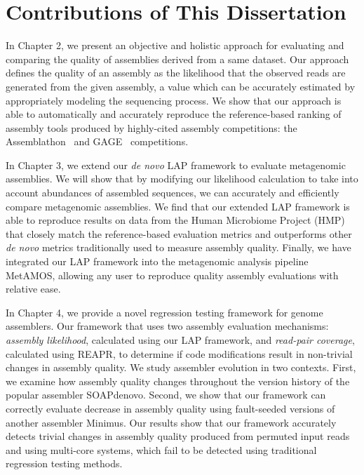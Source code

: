\section{Contributions of This Dissertation}

In Chapter 2, we present an objective and holistic approach for evaluating and
comparing the quality of assemblies derived from a same dataset.  Our
approach defines the quality of an assembly as the likelihood that the
observed reads are generated from the given assembly, a value which can
be accurately estimated by appropriately modeling the sequencing
process. We show that our approach is able to automatically and accurately reproduce the
reference-based ranking of assembly tools produced by highly-cited assembly competitions: the
Assemblathon~\cite{earl2011assemblathon} and GAGE~\cite{salzberg2011gage}
competitions.

In Chapter 3, we extend our \emph{de novo} LAP framework to evaluate metagenomic assemblies.
We will show that by modifying our likelihood calculation to take into account abundances of assembled sequences, we can accurately and efficiently compare metagenomic assemblies.
We find that our extended LAP framework is able to reproduce results on data from the Human Microbiome Project (HMP) that closely match the reference-based evaluation metrics and outperforms other \emph{de novo} metrics traditionally used to measure assembly quality.
Finally, we have integrated our LAP framework into the metagenomic analysis pipeline MetAMOS, allowing any user to reproduce quality assembly evaluations with relative ease.

In Chapter 4, we provide a novel regression testing framework for genome assemblers.
Our framework that uses two assembly evaluation mechanisms: \emph{assembly likelihood}, calculated using our LAP framework\cite{LAP}, and \emph{read-pair coverage}, calculated using REAPR\cite{hunt2013reapr}, to determine if code modifications result in non-trivial
changes in assembly quality.
We study assembler evolution in two contexts. First,
we examine how assembly quality changes
throughout the version history of the popular assembler SOAPdenovo. Second,
we show that our framework can correctly evaluate decrease in assembly quality
using fault-seeded versions of another assembler Minimus.
Our results show that our framework accurately detects trivial
changes in assembly quality produced from permuted input reads and using
multi-core systems, which fail to be detected using traditional regression
testing methods.

